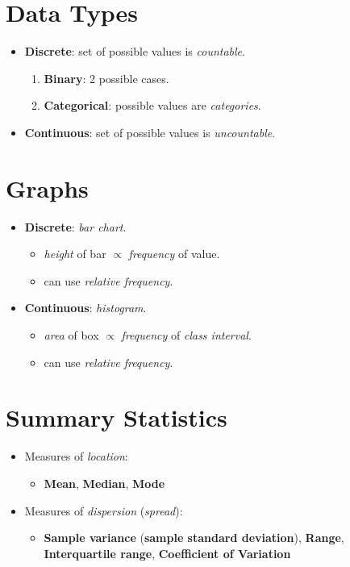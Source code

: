 \section*{Data Types}

\begin{itemize}
    \item \textbf{Discrete}: set of possible values is \textit{countable}.
    \begin{enumerate}
        \item \textbf{Binary}: 2 possible cases.
        \item \textbf{Categorical}: possible values are \textit{categories}.
    \end{enumerate}
    \item \textbf{Continuous}: set of possible values is \textit{uncountable}.
\end{itemize}

\section*{Graphs}

\begin{itemize}
    \item \textbf{Discrete}: \textit{bar chart}.
    \begin{itemize}
        \item \textit{height} of bar $\propto$ \textit{frequency} of value.
        \item can use \textit{relative frequency}.
    \end{itemize}
    \item \textbf{Continuous}: \textit{histogram}.
    \begin{itemize}
        \item \textit{area} of box $\propto$ \textit{frequency} of \textit{class interval}.
        \item can use \textit{relative frequency}.
    \end{itemize}
\end{itemize}

\section*{Summary Statistics}

\begin{itemize}
    \item Measures of \textit{location}:
    \begin{itemize}
        \item \textbf{Mean}, \textbf{Median}, \textbf{Mode}
    \end{itemize}
    \item Measures of \textit{dispersion} (\textit{spread}):
    \begin{itemize}
        \item \textbf{Sample variance} (\textbf{sample standard deviation}), \textbf{Range}, \textbf{Interquartile range}, \textbf{Coefficient of Variation}
    \end{itemize}
\end{itemize}

